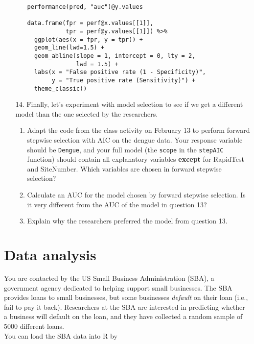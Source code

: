 \documentclass[11pt]{article}
\begin{document}
\begin{enumerate}
\begin{enumerate}
\begin{verbatim}
performance(pred, "auc")@y.values 

data.frame(fpr = perf@x.values[[1]],
           tpr = perf@y.values[[1]]) %>%
  ggplot(aes(x = fpr, y = tpr)) +
  geom_line(lwd=1.5) +
  geom_abline(slope = 1, intercept = 0, lty = 2,
              lwd = 1.5) +
  labs(x = "False positive rate (1 - Specificity)",
       y = "True positive rate (Sensitivity)") +
  theme_classic()
\end{verbatim}

\end{enumerate}

\item[14.] Finally, let's experiment with model selection to see if we get a different model than the one selected by the researchers.

\begin{enumerate}
\item Adapt the code from the class activity on February 13 to perform forward stepwise selection with AIC on the dengue data. Your response variable should be \verb;Dengue;, and your full model (the \verb;scope; in the \verb;stepAIC; function) should contain all explanatory variables \textbf{except} for RapidTest and SiteNumber. Which variables are chosen in forward stepwise selection?

\item Calculate an AUC for the model chosen by forward stepwise selection. Is it very different from the AUC of the model in question 13?

\item Explain why the researchers preferred the model from question 13.
\end{enumerate}
\end{enumerate}

\section{Data analysis}

You are contacted by the US Small Business Administration (SBA), a government agency dedicated to helping support small businesses. The SBA provides loans to small businesses, but some businesses \textit{default} on their loan (i.e., fail to pay it back). Researchers at the SBA are interested in predicting whether a business will default on the loan, and they have collected a random sample of 5000 different loans.\\

\noindent You can load the SBA data into R by
\end{document}
